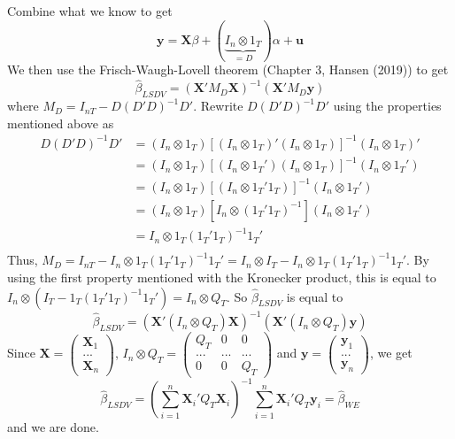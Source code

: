 \begin{itemize}
\[\]
Combine what we know to get 
\[
\mathbf{y} = \mathbf{X}\beta+(\underbrace{I_n\otimes 1_T}_{=D})\alpha+\mathbf{u}
\]
We then use the Frisch-Waugh-Lovell theorem (Chapter 3, Hansen (2019)) to get
\[
\hat{\beta}_{LSDV}=(\mathbf{X}'M_D\mathbf{X})^{-1}(\mathbf{X}'M_D\mathbf{y})
\]
where $M_D = I_{nT}-D(D'D)^{-1}D'$. Rewrite $D(D'D)^{-1}D'$ using the properties mentioned above as
\[
\begin{aligned}
D(D'D)^{-1}D'&=(I_n\otimes 1_T)[(I_n\otimes 1_T)'(I_n\otimes 1_T)]^{-1}(I_n\otimes 1_T)'\\
&=(I_n\otimes 1_T)[(I_n\otimes 1_T')(I_n\otimes 1_T)]^{-1}(I_n\otimes 1_T')\\
&=(I_n\otimes 1_T)[(I_n\otimes 1_T'1_T)]^{-1}(I_n\otimes 1_T')\\
&=(I_n\otimes 1_T)[I_n\otimes (1_T'1_T)^{-1}](I_n\otimes 1_T')\\
&=I_n\otimes 1_T(1_T'1_T)^{-1}1_T'\\
\end{aligned}
\]
Thus, $M_D = I_{nT} - I_n\otimes 1_T(1_T'1_T)^{-1}1_T'=I_n\otimes I_T -I_n\otimes  1_T(1_T'1_T)^{-1}1_T'$. By using the first property mentioned with the Kronecker product, this is equal to $I_n\otimes(I_T - 1_T(1_T'1_T)^{-1}1_T')=I_n\otimes Q_T$. So $\hat{\beta}_{LSDV}$ is equal to
\[
\hat{\beta}_{LSDV}=(\mathbf{X}'(I_n\otimes Q_T)\mathbf{X})^{-1}(\mathbf{X}'(I_n\otimes Q_T)\mathbf{y})
\]
Since $\mathbf{X} = \begin{pmatrix}\mathbf{X}_1\\ ... \\ \mathbf{X}_n \end{pmatrix}$, $I_n\otimes Q_T =  \begin{pmatrix}Q_T & 0 & 0 \\ ...&...&...\\0 & 0 & Q_T \end{pmatrix}$ and $\mathbf{y} = \begin{pmatrix}\mathbf{y}_1\\ ... \\ \mathbf{y}_n \end{pmatrix}$, we get
\[
\hat{\beta}_{LSDV}=\left(\sum_{i=1}^n \mathbf{X}_i'Q_T \mathbf{X}_i\right)^{-1}\sum_{i=1}^n \mathbf{X}_i'Q_T \mathbf{y}_i = \hat{\beta}_{WE}
\]
and we are done.
\end{itemize}
